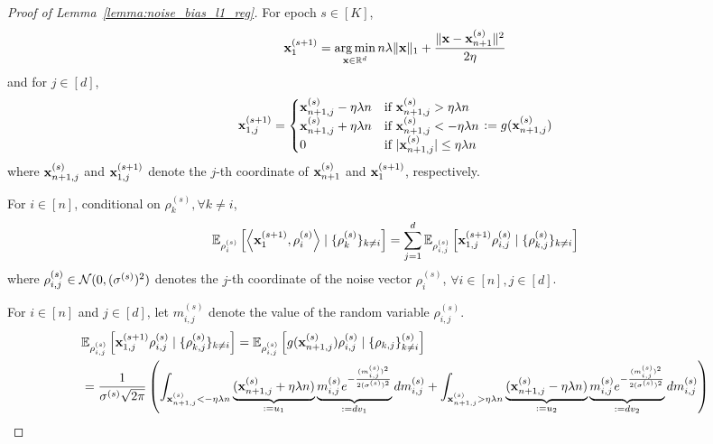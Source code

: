 \begin{proof}[Proof of Lemma~\ref{lemma:noise_bias_l1_reg}]

For epoch $s \in [K]$,
\begin{align}
    {\mathbf{x}}_{1}^{(s+1)} = \operatorname*{arg\,min}_{{\mathbf{x}}\in\mathbb{R}^{d}} n \lambda \|{\mathbf{x}}\|_1 + \frac{\|{\mathbf{x}} - {\mathbf{x}}_{n+1}^{(s)}\|^2}{2\eta}   
\end{align}
and for $j\in [d]$, 
\begin{align}
    {\mathbf{x}}_{1, j}^{(s+1)} = \begin{cases}
        {\mathbf{x}}_{n+1,j}^{(s)} - \eta \lambda n & \text{if ${\mathbf{x}}_{n+1, j}^{(s)} > \eta \lambda n$}\\
        {\mathbf{x}}_{n+1, j}^{(s)} + \eta \lambda n & \text{if ${\mathbf{x}}_{n+1, j}^{(s)} < -\eta \lambda n$}\\
        0 & \text{if $|{\mathbf{x}}_{n+1, j}^{(s)}| \leq \eta \lambda n$}
    \end{cases}
    := g({\mathbf{x}}_{n+1,j}^{(s)})
\end{align}
where ${\mathbf{x}}_{n+1,j}^{(s)}$ and ${\mathbf{x}}_{1,j}^{(s+1)}$ denote the $j$-th coordinate of ${\mathbf{x}}_{n+1}^{(s)}$ and ${\mathbf{x}}_{1}^{(s+1)}$, respectively.

For $i\in [n]$, conditional on $\rho_k^{(s)}, \forall k\neq i$,
\begin{align}
\label{eq:l1_reg_cond_exp}
    \mathbb{E}_{\rho_i^{(s)}}\left[\left\langle {\mathbf{x}}_{1}^{(s+1)}, \rho_i^{(s)} \right\rangle \mid \{\rho_k^{(s)}\}_{k\neq i}\right]
    = \sum_{j=1}^{d} \mathbb{E}_{\rho_{i,j}^{(s)}}\left[ {\mathbf{x}}_{1, j}^{(s+1)} \rho_{i, j}^{(s)} \mid \{\rho_{k, j}^{(s)}\}_{k \neq i}\right]
\end{align}
where $\rho_{i, j}^{(s)} \in {\mathcal{N}}(0, (\sigma^{(s)})^2)$ denotes the $j$-th coordinate of the noise vector $\rho_i^{(s)}$, $\forall i\in [n], j\in[d]$.

For $i\in [n]$ and $j\in [d]$, let $m_{i,j}^{(s)}$ denote the value of the random variable $\rho_{i, j}^{(s)}$. 
\begin{align}
    &\mathbb{E}_{\rho_{i,j}^{(s)}}\left[{\mathbf{x}}_{1,j}^{(s+1)} \rho_{i, j}^{(s)} \mid \{\rho_{k, j}^{(s)}\}_{k \neq i} \right]
    = \mathbb{E}_{\rho_{i,j}^{(s)}}\left[ g({\mathbf{x}}_{n+1,j}^{(s)}) \rho_{i, j}^{(s)} \mid \{\rho_{k, j}\}_{k \neq i}^{(s)} \right]\\
    &= \frac{1}{\sigma^{(s)} \sqrt{2\pi}}
    \left(
    \int_{{\mathbf{x}}_{n+1,j}^{(s)} < -\eta \lambda n} \underbrace{({\mathbf{x}}_{n+1,j}^{(s)} + \eta \lambda n)}_{:=u_1}
    \underbrace{
    m_{i, j}^{(s)} e^{-\frac{(m_{i,j}^{(s)})^2}{2 (\sigma^{(s)})^2}}
    }_{:=d v_1} dm_{i, j}^{(s)}
    + \int_{{\mathbf{x}}_{n+1,j}^{(s)} > \eta \lambda n} \underbrace{({\mathbf{x}}_{n+1,j}^{(s)} - \eta \lambda n)}_{:= u_2} 
    \underbrace{m_{i, j}^{(s)} e^{-\frac{(m_{i, j}^{(s)})^2}{2 (\sigma^{(s)})^2}}}_{:=d v_2} dm_{i, j}^{(s)}
    \right)
\end{align}


\end{proof}
